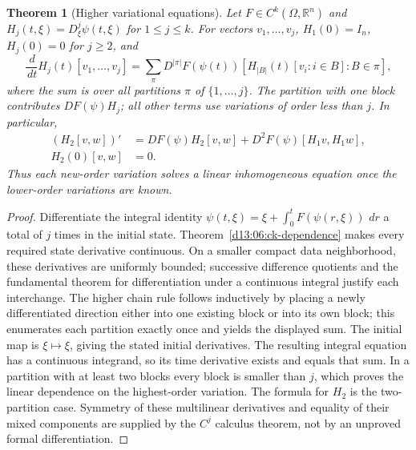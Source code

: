 \documentclass[11pt,oneside]{book}
\newtheorem{theorem}{Theorem}[chapter]
\theoremstyle{definition}
\theoremstyle{remark}\newtheorem{remark}[theorem]{Remark}
\newcommand{\R}{\mathbb R}\newcommand{\C}{\mathbb C}
\newcommand{\dd}{\,d}\newcommand{\id}{\operatorname{id}}
\begin{document}
\begin{theorem}[Higher variational equations]\label{d13:06:variations}
Let $F\in C^k(\Omega,\R^n)$ and
$H_j(t,\xi)=D_\xi^j\psi(t,\xi)$ for $1\leq j\leq k$.
For vectors $v_1,\ldots,v_j$, $H_1(0)=I_n$,
$H_j(0)=0$ for $j\geq2$, and
\[
 \frac{\dd}{\dd t}H_j(t)[v_1,\ldots,v_j]
 =\sum_{\pi}
 D^{|\pi|}F(\psi(t))
 \left[H_{|B|}(t)[v_i:i\in B]:B\in\pi\right],
\]
where the sum is over all partitions $\pi$ of $\{1,\ldots,j\}$.
The partition with one block contributes $DF(\psi)H_j$; all other
terms use variations of order less than $j$. In particular,
\[
 \begin{split}
 (H_2[v,w])'&=DF(\psi)H_2[v,w]
             +D^2F(\psi)[H_1v,H_1w],\\
 H_2(0)[v,w]&=0.
 \end{split}
\]
Thus each new-order variation solves a linear inhomogeneous equation
once the lower-order variations are known.
\end{theorem}
\begin{proof}
Differentiate the integral identity
$\psi(t,\xi)=\xi+\int_0^t F(\psi(r,\xi))\,\dd r$ a total of
$j$ times in the initial state. Theorem~\ref{d13:06:ck-dependence}
makes every required state derivative continuous. On a smaller compact
data neighborhood, these derivatives are uniformly bounded; successive
difference quotients and the fundamental theorem for differentiation
under a continuous integral justify each interchange. The higher chain
rule follows inductively by placing a newly differentiated direction
either into one existing block or into its own block; this enumerates
each partition exactly once and yields the displayed sum. The initial
map is $\xi\mapsto\xi$, giving the stated initial derivatives.
The resulting integral equation has a continuous integrand, so its
time derivative exists and equals that sum. In a partition with at
least two blocks every block is smaller than $j$, which proves the
linear dependence on the highest-order variation. The formula for
$H_2$ is the two-partition case. Symmetry of these multilinear
derivatives and equality of their mixed components are supplied by
the $C^j$ calculus theorem, not by an unproved formal differentiation.
\end{proof}
\end{document}
